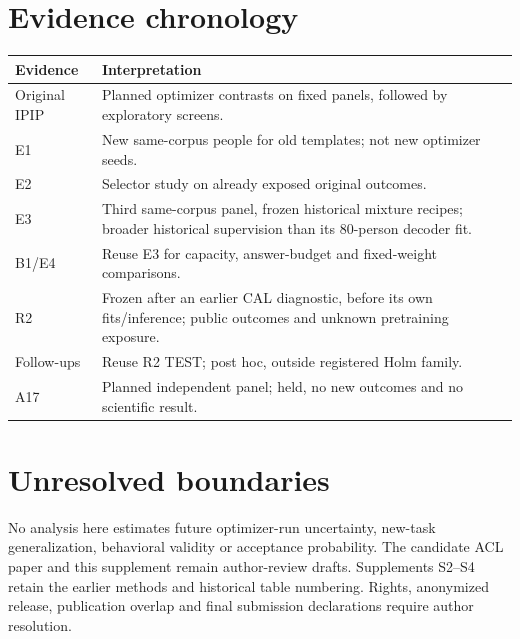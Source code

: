 \documentclass[10pt]{article}
\begin{document}
\section{Evidence chronology}
\begin{longtable}{@{}p{}p{}@{}}\toprule
Evidence & Interpretation\\\midrule
Original IPIP & Planned optimizer contrasts on fixed panels, followed by exploratory screens.\\
E1 & New same-corpus people for old templates; not new optimizer seeds.\\
E2 & Selector study on already exposed original outcomes.\\
E3 & Third same-corpus panel, frozen historical mixture recipes; broader historical supervision than its 80-person decoder fit.\\
B1/E4 & Reuse E3 for capacity, answer-budget and fixed-weight comparisons.\\
R2 & Frozen after an earlier CAL diagnostic, before its own fits/inference; public outcomes and unknown pretraining exposure.\\
Follow-ups & Reuse R2 TEST; post hoc, outside registered Holm family.\\
A17 & Planned independent panel; held, no new outcomes and no scientific result.\\\bottomrule
\end{longtable}
\section{Unresolved boundaries}
No analysis here estimates future optimizer-run uncertainty, new-task generalization, behavioral validity or acceptance probability. The candidate ACL paper and this supplement remain author-review drafts. Supplements S2--S4 retain the earlier methods and historical table numbering. Rights, anonymized release, publication overlap and final submission declarations require author resolution.
\end{document}
